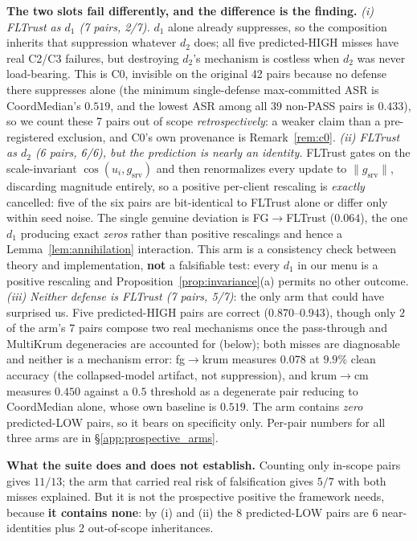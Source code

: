 \documentclass{article}
\begin{document}
\textbf{The two slots fail differently, and the difference is the finding.} \emph{(i) FLTrust as $d_1$ (7 pairs, 2/7).} $d_1$ alone already suppresses, so the composition inherits that suppression whatever $d_2$ does; all five predicted-HIGH misses have real C2/C3 failures, but destroying $d_2$'s mechanism is costless when $d_2$ was never load-bearing. This is C0, invisible on the original 42 pairs because no defense there suppresses alone (the minimum single-defense max-committed ASR is CoordMedian's $0.519$, and the lowest ASR among all 39 non-PASS pairs is $0.433$), so we count these 7 pairs out of scope \emph{retrospectively}: a weaker claim than a pre-registered exclusion, and C0's own provenance is Remark~\ref{rem:c0}. \emph{(ii) FLTrust as $d_2$ (6 pairs, 6/6), but the prediction is nearly an identity.} FLTrust gates on the scale-invariant $\cos(u_i, g_{\mathrm{srv}})$ and then renormalizes every update to $\|g_{\mathrm{srv}}\|$, discarding magnitude entirely, so a positive per-client rescaling is \emph{exactly} cancelled: five of the six pairs are bit-identical to FLTrust alone or differ only within seed noise. The single genuine deviation is FG$\to$FLTrust ($0.064$), the one $d_1$ producing exact \emph{zeros} rather than positive rescalings and hence a Lemma~\ref{lem:annihilation} interaction. This arm is a consistency check between theory and implementation, \textbf{not} a falsifiable test: every $d_1$ in our menu is a positive rescaling and Proposition~\ref{prop:invariance}(a) permits no other outcome. \emph{(iii) Neither defense is FLTrust (7 pairs, 5/7)}: the only arm that could have surprised us. Five predicted-HIGH pairs are correct ($0.870$--$0.943$), though only $2$ of the arm's $7$ pairs compose two real mechanisms once the pass-through and MultiKrum degeneracies are accounted for (below); both misses are diagnosable and neither is a mechanism error: fg$\to$krum measures $0.078$ at $9.9\%$ clean accuracy (the collapsed-model artifact, not suppression), and krum$\to$cm measures $0.450$ against a $0.5$ threshold as a degenerate pair reducing to CoordMedian alone, whose own baseline is $0.519$. The arm contains \emph{zero} predicted-LOW pairs, so it bears on specificity only. Per-pair numbers for all three arms are in §\ref{app:prospective_arms}.

\textbf{What the suite does and does not establish.} Counting only in-scope pairs gives $11/13$; the arm that carried real risk of falsification gives $5/7$ with both misses explained. But it is not the prospective positive the framework needs, because \textbf{it contains none}: by (i) and (ii) the 8 predicted-LOW pairs are 6 near-identities plus 2 out-of-scope inheritances.
\end{document}
